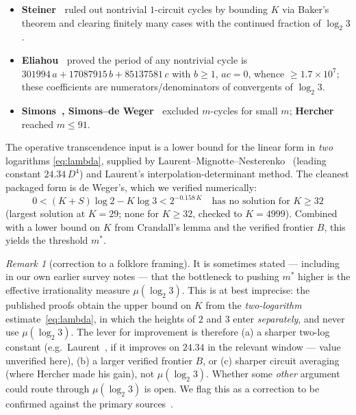\documentclass[11pt]{amsart}
\theoremstyle{definition}
\theoremstyle{remark}
\newtheorem{remark}[theorem]{Remark}
\begin{document}
\begin{itemize}
\item \textbf{Steiner~\citep{steiner1977}} ruled out nontrivial $1$-circuit cycles by bounding $K$ via
Baker's theorem and clearing finitely many cases with the continued fraction of $\log_2 3$.
\item \textbf{Eliahou~\citep{eliahou1993}} proved the period of any nontrivial cycle is
$301994\,a+17087915\,b+85137581\,c$ with $b\ge1$, $ac=0$, whence $\ge 1.7\times10^7$; these coefficients
are numerators/denominators of convergents of $\log_2 3$.
\item \textbf{Simons~\citep{simons2005}, Simons--de Weger~\citep{simonsdeweger2005}} excluded $m$-cycles
for small $m$; \textbf{Hercher~\citep{hercher2023}} reached $m\le 91$. %
\end{itemize}

The operative transcendence input is a lower bound for the linear form in \emph{two} logarithms
\eqref{eq:lambda}, supplied by Laurent--Mignotte--Nesterenko~\citep{lmn1995} (leading constant
$24.34\,D^4$) and Laurent's interpolation-determinant method. %
The cleanest packaged form is de Weger's, which we verified numerically:
\begin{equation}
   0<(K+S)\log2-K\log3<2^{-0.158\,K}\quad\text{has no solution for }K\ge32
   \label{eq:deweger}
\end{equation}
(largest solution at $K=29$; none for $K\ge32$, checked to $K=4999$). %
Combined with a lower bound on $K$ from Crandall's lemma and the verified frontier $B$, this yields the
threshold $m^*$.

\begin{remark}[correction to a folklore framing]\label{rem:cyclecorrection}
It is sometimes stated --- including in our own earlier survey notes --- that the bottleneck to pushing
$m^*$ higher is the effective irrationality measure $\mu(\log_2 3)$. This is at best imprecise: the
published proofs obtain the upper bound on $K$ from the \emph{two-logarithm} estimate~\eqref{eq:lambda},
in which the heights of $2$ and $3$ enter \emph{separately}, and never use $\mu(\log_2 3)$. The lever for
improvement is therefore (a) a sharper two-log constant (e.g.\ Laurent~\citep{laurent2008}, if it improves
on $24.34$ in the relevant window --- value unverified here), (b) a larger verified frontier $B$, or
(c) sharper circuit averaging (where Hercher made his gain), not $\mu(\log_2 3)$. Whether some \emph{other}
argument could route through $\mu(\log_2 3)$ is open. We flag this as a correction to be confirmed against
the primary sources~\citep{simons2005,hercher2023,lmn1995,laurent2008}.
\end{remark}
\end{document}
